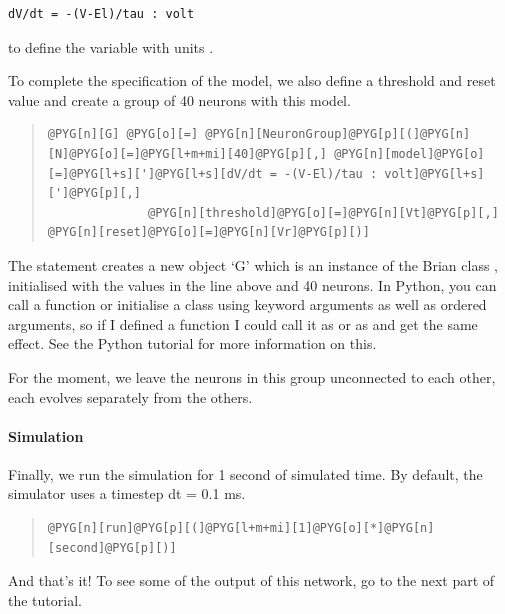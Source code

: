 \documentclass[letterpaper,10pt,english]{manual}
\begin{document}
\begin{Verbatim}[commandchars=@\[\]]
dV/dt = -(V-El)/tau : volt
\end{Verbatim}

to define the variable  with units .

To complete the specification of the model, we also define a threshold and reset
value and create a group of 40 neurons with this model.
\begin{quote}

\begin{Verbatim}[commandchars=@\[\]]
@PYG[n][G] @PYG[o][=] @PYG[n][NeuronGroup]@PYG[p][(]@PYG[n][N]@PYG[o][=]@PYG[l+m+mi][40]@PYG[p][,] @PYG[n][model]@PYG[o][=]@PYG[l+s][']@PYG[l+s][dV/dt = -(V-El)/tau : volt]@PYG[l+s][']@PYG[p][,]
              @PYG[n][threshold]@PYG[o][=]@PYG[n][Vt]@PYG[p][,] @PYG[n][reset]@PYG[o][=]@PYG[n][Vr]@PYG[p][)]
\end{Verbatim}
\end{quote}

The statement creates a new object `G' which is an instance of the
Brian class \hyperlink{brian.NeuronGroup}{}, initialised with the values in the
line above and 40 neurons. In Python, you can call a function or initialise
a class using keyword arguments as well as ordered arguments, so
if I defined a function  I could call it as  or
as  and get the same effect. See the Python tutorial
for more information on this.

For the moment, we leave the neurons in this group unconnected
to each other, each evolves separately from the others.


\paragraph{Simulation}

Finally, we run the simulation for 1 second of simulated time.
By default, the simulator uses a timestep dt = 0.1 ms.
\begin{quote}

\begin{Verbatim}[commandchars=@\[\]]
@PYG[n][run]@PYG[p][(]@PYG[l+m+mi][1]@PYG[o][*]@PYG[n][second]@PYG[p][)]
\end{Verbatim}
\end{quote}

And that's it! To see some of the output of this network, go
to the next part of the tutorial.
\end{document}
